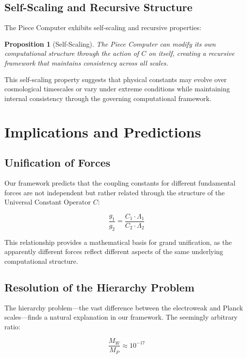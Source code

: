 \documentclass{article}
\newtheorem{proposition}{Proposition}
\begin{document}
\subsection{Self-Scaling and Recursive Structure}

The Piece Computer exhibits self-scaling and recursive properties:

\begin{proposition}[Self-Scaling]
The Piece Computer can modify its own computational structure through the action of $C$ on itself, creating a recursive framework that maintains consistency across all scales.
\end{proposition}

This self-scaling property suggests that physical constants may evolve over cosmological timescales or vary under extreme conditions while maintaining internal consistency through the governing computational framework.

\section{Implications and Predictions}

\subsection{Unification of Forces}

Our framework predicts that the coupling constants for different fundamental forces are not independent but rather related through the structure of the Universal Constant Operator $C$:

\begin{equation}
\frac{g_1}{g_2} = \frac{C_1 \cdot \Lambda_1}{C_2 \cdot \Lambda_2}
\end{equation}

This relationship provides a mathematical basis for grand unification, as the apparently different forces reflect different aspects of the same underlying computational structure.

\subsection{Resolution of the Hierarchy Problem}

The hierarchy problem—the vast difference between the electroweak and Planck scales—finds a natural explanation in our framework. The seemingly arbitrary ratio:

\begin{equation}
\frac{M_W}{M_P} \approx 10^{-17}
\end{equation}
\end{document}
